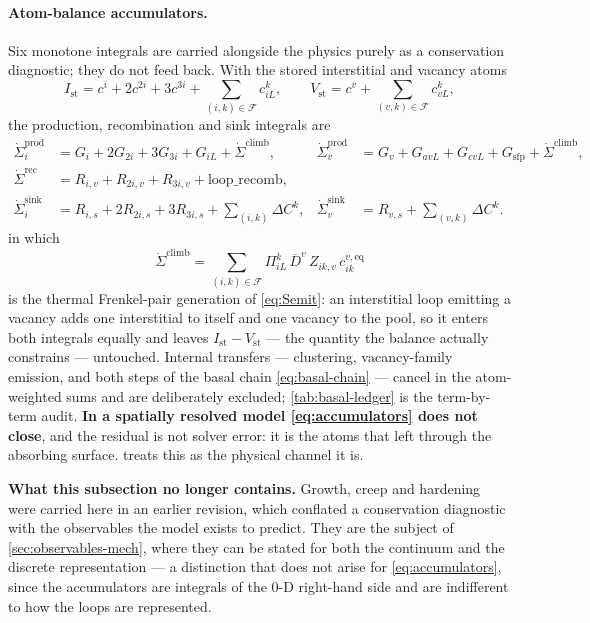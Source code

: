 \documentclass{article}
\begin{document}
\paragraph{Atom-balance accumulators.} Six monotone integrals are carried
alongside the physics purely as a conservation diagnostic; they do not feed back.
With the stored interstitial and vacancy atoms
\begin{equation}
  I_{\mathrm{st}}=c^i+2c^{2i}+3c^{3i}+\!\!\sum_{(i,k)\in\mathcal F}\!\!c^{k}_{iL},
  \qquad
  V_{\mathrm{st}}=c^v+\!\!\sum_{(v,k)\in\mathcal F}\!\!c^{k}_{vL},
  \label{eq:stored}
\end{equation}
the production, recombination and sink integrals are
\begin{align}
\dot\Sigma^{\mathrm{prod}}_i &= G_i+2G_{2i}+3G_{3i}+G_{iL}
   +\dot\Sigma^{\mathrm{climb}}, &
\dot\Sigma^{\mathrm{prod}}_v &= G_v+G_{avL}+G_{cvL}+G_{\mathrm{sfp}}
   +\dot\Sigma^{\mathrm{climb}},\\
\dot\Sigma^{\mathrm{rec}} &= R_{i,v}+R_{2i,v}+R_{3i,v}+\mathrm{loop\_recomb}, & &\\
\dot\Sigma^{\mathrm{sink}}_i &= R_{i,s}+2R_{2i,s}+3R_{3i,s}
   +\!\!\sum_{(i,k)}\!\Delta C^{k}, &
\dot\Sigma^{\mathrm{sink}}_v &= R_{v,s}+\!\!\sum_{(v,k)}\!\Delta C^{k}.
\label{eq:accumulators}
\end{align}
in which
\begin{equation}
  \dot\Sigma^{\mathrm{climb}}
   =\!\!\sum_{(i,k)\in\mathcal F}\!\!
     \Pi^k_{iL}\,\overline D^{v}\,Z_{ik,v}\,c^{v,\mathrm{eq}}_{ik}
  \label{eq:climbsource}
\end{equation}
is the thermal Frenkel-pair generation of \cref{eq:Semit}: an interstitial loop
emitting a vacancy adds one interstitial to itself and one vacancy to the pool,
so it enters both integrals equally and leaves
$I_{\mathrm{st}}-V_{\mathrm{st}}$ --- the quantity the balance actually
constrains --- untouched. Internal transfers ---
clustering, vacancy-family emission, and both steps of the basal chain
\cref{eq:basal-chain} --- cancel in the atom-weighted sums and are deliberately
excluded; \cref{tab:basal-ledger} is the term-by-term audit. \textbf{In a spatially resolved
model \cref{eq:accumulators} does not close}, and the residual is not solver
error: it is the atoms that left through the absorbing surface.
 treats this as the physical channel it is.

\textbf{What this subsection no longer contains.} Growth, creep and hardening
were carried here in an earlier revision, which conflated a conservation
diagnostic with the observables the model exists to predict. They are the subject
of \cref{sec:observables-mech}, where they can be stated for both the continuum
and the discrete representation --- a distinction that does not arise for
\cref{eq:accumulators}, since the accumulators are integrals of the 0-D
right-hand side and are indifferent to how the loops are represented.
\end{document}
